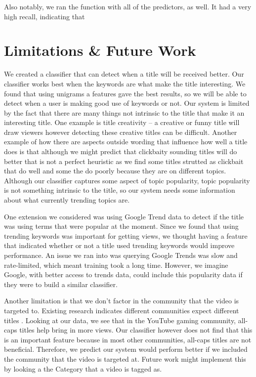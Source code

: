 \documentclass[a4paper,12pt]{article}
\begin{document}
Also notably, we ran the function with all of the predictors, as well. It had a very high recall, indicating that 


\section{Limitations \& Future Work}
We created a classifier that can detect when a title will be received better. Our classifier works best when the keywords are what make the title interesting. We found that using unigrams a features gave the best results, so we will be able to detect when a user is making good use of keywords or not. Our system is limited by the fact that there are many things not intrinsic to the title that make it an interesting title. One example is title creativity -- a creative or funny title will draw viewers however detecting these creative titles can be difficult. Another example of how there are aspects outside wording that influence how well a title does is that although we might predict that clickbaity sounding titles will do better that is not a perfect heuristic as we find some titles strutted as clickbait that do well and some the do poorly because they are on different topics. Although our classifier captures some aspect of topic popularity, topic popularity is not something intrinsic to the title, so our system needs some information about what currently trending topics are.

One extension we considered was using Google Trend data to detect if the title was using terms that were popular at the moment. Since we found that using trending keywords was important for getting views, we thought having a feature that indicated whether or not a title used trending keywords would improve performance. An issue we ran into was querying Google Trends was slow and rate-limited, which meant training took a long time. However, we imagine Google, with better access to trends data, could include this popularity data if they were to build a similar classifier. 

Another limitation is that we don't factor in the community that the video is targeted to. Existing research indicates different communities expect different titles \cite{himabindu+mcauley+leskovec:13}. Looking at our data, we see that in the YouTube gaming community, all-caps titles help bring in more views. Our classifier however does not find that this is an important feature because in most other communities, all-caps titles are not beneficial. Therefore, we predict our system would perform better if we included the community that the video is targeted at. Future work might implement this by looking a the Category that a video is tagged as.
\end{document}
